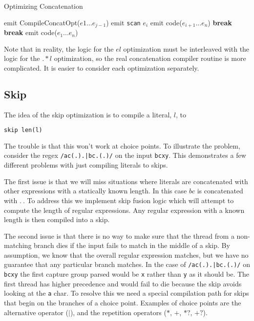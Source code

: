 \begin{algorithm}
\caption{Optimizing Concatenation} \label{algo:optconcat}
\begin{algorithmic}
          \State emit CompileConcatOpt($e1 ... e_{j-1}$)
          \State emit \verb'scan' $e_i$
          \State emit code($e_{i+1} ... e_n$)
          \State \textbf{break}
        \EndIf
      \EndFor
      \State \textbf{break}
    \EndIf
  \EndFor
    \State emit code($e_1 ... e_n$)
  \EndIf
\EndProcedure
\end{algorithmic}
\end{algorithm}

Note that in reality, the logic for the $el$ optimization must be
interleaved with the logic for the $.*l$ optimization, so the
real concatenation compiler routine is more complicated. It is
easier to consider each optimization separately.

\subsection{Skip}
\label{section:skipopt}

The idea of the skip optimization is to compile a literal, $l$, to

\begin{verbatim}
skip len(l)
\end{verbatim}

The trouble is that this won't work at choice points. To illustrate the
problem, consider the regex \verb'/ac(.).|bc.(.)/' on the input
\verb'bcxy'. This demonstrates a few different problems with just
compiling literals to skips.

The first issue is that we will miss situations where literals are
concatenated with other expressions with a statically known length.
In this case $bc$ is concatenated with $. \:$. To address this
we implement skip fusion logic which will attempt to compute the
length of regular expressions. Any regular expression with a
known length is then compiled into a skip.

The second issue is that there is no way to make sure that the
thread from a non-matching branch dies if the input fails to match in
the middle of a skip. By assumption, we know that the overall regular
expression matches, but we have no guarantee that any particular branch
matches. In the case of \verb'/ac(.).|bc.(.)/' on \verb'bcxy' the
first capture group parsed would be \verb'x' rather than \verb'y' as
it should be. The first thread has higher precedence and would
fail to die because the skip avoids looking at the \verb'a' char.
To resolve this we need a special compilation path for skips
that begin on the branches of a choice point. Examples of
choice points are the alternative operator ($\rvert$),
and the repetition operators ($*$, $+$, $*?$, $+?$).

